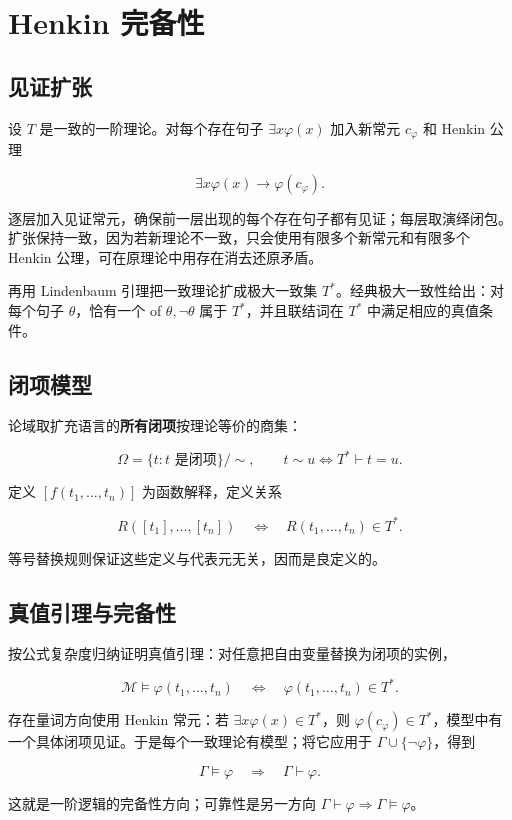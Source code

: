 \section{Henkin 完备性}


\subsection{见证扩张}


设 $T$ 是一致的一阶理论。对每个存在句子 $\exists x\varphi(x)$ 加入新常元 $c_\varphi$ 和 Henkin 公理

\[
\exists x\varphi(x)\to\varphi(c_\varphi).
\]

逐层加入见证常元，确保前一层出现的每个存在句子都有见证；每层取演绎闭包。扩张保持一致，因为若新理论不一致，只会使用有限多个新常元和有限多个 Henkin 公理，可在原理论中用存在消去还原矛盾。

再用 Lindenbaum 引理把一致理论扩成极大一致集 $T^*$。经典极大一致性给出：对每个句子 $\theta$，恰有一个 of $\theta,\neg\theta$ 属于 $T^*$，并且联结词在 $T^*$ 中满足相应的真值条件。

\subsection{闭项模型}


论域取扩充语言的\textbf{所有闭项}按理论等价的商集：

\[
\Omega=\{t:t\text{ 是闭项}\}/\sim,
\qquad
t\sim u\Longleftrightarrow T^*\vdash t=u.
\]

定义 $[f(t_1,\ldots,t_n)]$ 为函数解释，定义关系

\[
R([t_1],\ldots,[t_n])\quad\Longleftrightarrow\quad R(t_1,\ldots,t_n)\in T^*.
\]

等号替换规则保证这些定义与代表元无关，因而是良定义的。

\subsection{真值引理与完备性}


按公式复杂度归纳证明真值引理：对任意把自由变量替换为闭项的实例，

\[
\mathcal M\models\varphi(t_1,\ldots,t_n)
\quad\Longleftrightarrow\quad
\varphi(t_1,\ldots,t_n)\in T^*.
\]

存在量词方向使用 Henkin 常元：若 $\exists x\varphi(x)\in T^*$，则 $\varphi(c_\varphi)\in T^*$，模型中有一个具体闭项见证。于是每个一致理论有模型；将它应用于 $\Gamma\cup\{\neg\varphi\}$，得到

\[
\Gamma\models\varphi\quad\Longrightarrow\quad\Gamma\vdash\varphi.
\]

这就是一阶逻辑的完备性方向；可靠性是另一方向 $\Gamma\vdash\varphi\Rightarrow\Gamma\models\varphi$。
